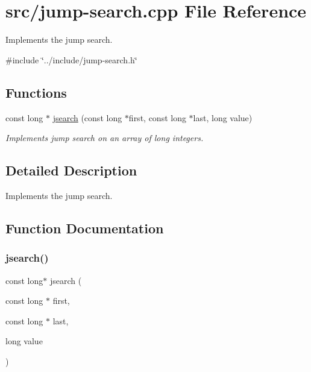 \hypertarget{jump-search_8cpp}{}\section{src/jump-\/search.cpp File Reference}
\label{jump-search_8cpp}


Implements the jump search.  


{\ttfamily \#include \char`\"{}../include/jump-\/search.\+h\char`\"{}}\newline
\subsection*{Functions}
\begin{DoxyCompactItemize}
\item 
const long $\ast$ \mbox{\hyperlink{jump-search_8cpp_aa55bd95d0c3b2fd3119f8a1e8fee22fd}{jsearch}} (const long $\ast$first, const long $\ast$last, long value)
\begin{DoxyCompactList}\small\item\em Implements jump search on an array of long integers. \end{DoxyCompactList}\end{DoxyCompactItemize}


\subsection{Detailed Description}
Implements the jump search. 



\subsection{Function Documentation}
\mbox{\label{jump-search_8cpp_aa55bd95d0c3b2fd3119f8a1e8fee22fd}} 
\subsubsection{\texorpdfstring{jsearch()}{jsearch()}}
{\footnotesize\ttfamily const long$\ast$ jsearch (\begin{DoxyParamCaption}\item[{const long $\ast$}]{first,  }\item[{const long $\ast$}]{last,  }\item[{long}]{value }\end{DoxyParamCaption})}



